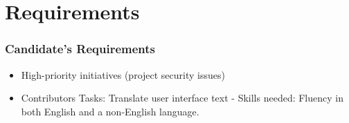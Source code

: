 \section{Requirements}

\begin{frame}[allowframebreaks]
\frametitle{Candidate's Requirements}

    \begin{itemize}
    	\item High-priority initiatives (project security issues)
    	\item Contributors Tasks: Translate user interface text \linebreak
    	- Skills needed: Fluency in both English and a non-English language.
	\end{itemize}

\end{frame}

